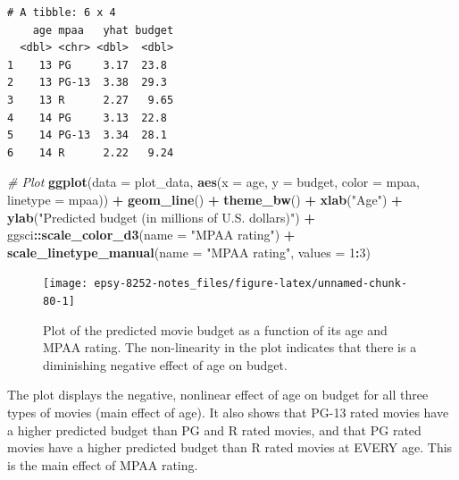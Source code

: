 \documentclass[]{book}
\newenvironment{Shaded}{\begin{snugshade}}{\end{snugshade}}
\newcommand{\CommentTok}[1]{\textcolor[rgb]{0.56,0.35,0.01}{\textit{#1}}}
\newcommand{\DataTypeTok}[1]{\textcolor[rgb]{0.13,0.29,0.53}{#1}}
\newcommand{\DecValTok}[1]{\textcolor[rgb]{0.00,0.00,0.81}{#1}}
\newcommand{\KeywordTok}[1]{\textcolor[rgb]{0.13,0.29,0.53}{\textbf{#1}}}
\newcommand{\NormalTok}[1]{#1}
\newcommand{\OperatorTok}[1]{\textcolor[rgb]{0.81,0.36,0.00}{\textbf{#1}}}
\newcommand{\StringTok}[1]{\textcolor[rgb]{0.31,0.60,0.02}{#1}}
\begin{document}
\begin{verbatim}
# A tibble: 6 x 4
    age mpaa   yhat budget
  <dbl> <chr> <dbl>  <dbl>
1    13 PG     3.17  23.8 
2    13 PG-13  3.38  29.3 
3    13 R      2.27   9.65
4    14 PG     3.13  22.8 
5    14 PG-13  3.34  28.1 
6    14 R      2.22   9.24
\end{verbatim}

\begin{Shaded}
\begin{Highlighting}[]
\CommentTok{# Plot}
\KeywordTok{ggplot}\NormalTok{(}\DataTypeTok{data =}\NormalTok{ plot_data, }\KeywordTok{aes}\NormalTok{(}\DataTypeTok{x =}\NormalTok{ age, }\DataTypeTok{y =}\NormalTok{ budget, }\DataTypeTok{color =}\NormalTok{ mpaa, }\DataTypeTok{linetype =}\NormalTok{ mpaa)) }\OperatorTok{+}
\StringTok{    }\KeywordTok{geom_line}\NormalTok{() }\OperatorTok{+}
\StringTok{    }\KeywordTok{theme_bw}\NormalTok{() }\OperatorTok{+}
\StringTok{  }\KeywordTok{xlab}\NormalTok{(}\StringTok{"Age"}\NormalTok{) }\OperatorTok{+}
\StringTok{  }\KeywordTok{ylab}\NormalTok{(}\StringTok{"Predicted budget (in millions of U.S. dollars)"}\NormalTok{) }\OperatorTok{+}
\StringTok{  }\NormalTok{ggsci}\OperatorTok{::}\KeywordTok{scale_color_d3}\NormalTok{(}\DataTypeTok{name =} \StringTok{"MPAA rating"}\NormalTok{) }\OperatorTok{+}
\StringTok{  }\KeywordTok{scale_linetype_manual}\NormalTok{(}\DataTypeTok{name =} \StringTok{"MPAA rating"}\NormalTok{, }\DataTypeTok{values =} \DecValTok{1}\OperatorTok{:}\DecValTok{3}\NormalTok{)}
\end{Highlighting}
\end{Shaded}

\begin{figure}

{\centering \texttt{[image: epsy-8252-notes\_files/figure-latex/unnamed-chunk-80-1]} 

}

\caption{Plot of the predicted movie budget as a function of its age and MPAA rating. The non-linearity in the plot indicates that there is a diminishing negative effect of age on budget.}\label{fig:unnamed-chunk-80}
\end{figure}

The plot displays the negative, nonlinear effect of age on budget for all three types of movies (main effect of age). It also shows that PG-13 rated movies have a higher predicted budget than PG and R rated movies, and that PG rated movies have a higher predicted budget than R rated movies at EVERY age. This is the main effect of MPAA rating.
\end{document}
